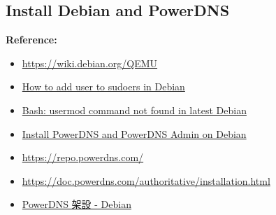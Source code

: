 \documentclass[12pt]{article}
\newenvironment{mycolorbox}[1][gray]{
  \renewmdenv[
    linewidth=2pt, linecolor=#1, backgroundcolor=#1!10,
    topline=false, bottomline=false, rightline=false,
    skipabove=10pt, skipbelow=10pt, innerleftmargin=10pt,
    innerrightmargin=0pt, innertopmargin=5pt, innerbottommargin=5pt
  ]{myquote}
  \begin{myquote}
}{\end{myquote}}
\begin{document}
\subsection{Install Debian and PowerDNS}
\begin{mycolorbox}[teal]
  \textbf{Reference:}
  \footnotesize
  \begin{itemize}
    \item \url{https://wiki.debian.org/QEMU}
    \item \href{https://www.cloudpanel.io/tutorial/how-to-add-user-to-sudoers-in-debian/}{How to add user to sudoers in Debian}
    \item \href{https://www.reddit.com/r/linuxquestions/comments/pcfjo6/bash_usermod_command_not_found_in_latest_debian/}{Bash: usermod command not found in latest Debian}
    \item \href{https://computingforgeeks.com/install-powerdns-and-powerdns-admin-on-debian/}{Install PowerDNS and PowerDNS Admin on Debian}
    \item \url{https://repo.powerdns.com/}
    \item \url{https://doc.powerdns.com/authoritative/installation.html}
    \item \href{https://wiki.freedomstu.com/books/%E9%96%8B%E6%BA%90%E8%BB%9F%E9%AB%94%E5%AE%89%E8%A3%9D%E6%B5%81%E7%A8%8B/page/powerdns-debian}{PowerDNS 架設 - Debian}
  \end{itemize}
\end{mycolorbox}
\end{document}
